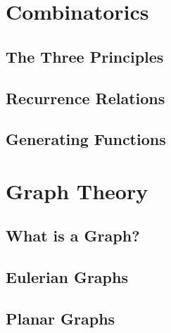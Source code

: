 \documentclass{article}
\begin{document}
\section{Combinatorics}

\subsection{The Three Principles}

\subsection{Recurrence Relations}

\subsection{Generating Functions}

\section{Graph Theory}

\subsection{What is a Graph?}

\subsection{Eulerian Graphs}

\subsection{Planar Graphs}
\end{document}
